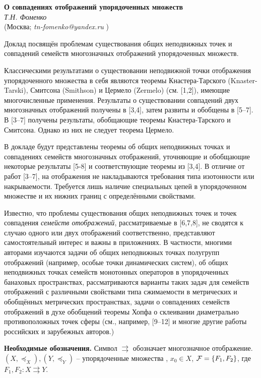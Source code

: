 \begin{center}{ \bf О совпадениях отображений упорядоченных множеств}\\
{\it Т.Н. Фоменко} \\
(Москва; {\it tn-fomenko@yandex.ru} )
\end{center}

Доклад посвящён проблемам существования общих неподвижных точек и совпадений семейств многозначных отображений упорядоченных множеств.

Классическими результатами о существовании неподвижной точки отображения упорядоченного множества в себя являются теоремы Кна\-стера-Тарского (Knaster-Tarski), Смитсона (Smithson) и Цермело (Zer\-melo) (см. [1,2]), имеющие многочисленные применения. Результаты о существовании совпадений двух многозначных отображений получены в [3,4], затем развиты и обобщены  в [5--7]. В  [3--7] получены результаты, обобщающие теоремы Кнастера-Тарского и Смитсона. Однако из них не следует теорема Цермело.

В докладе будут представлены теоремы об общих неподвижных точках и совпадениях семейств многозначных отображений, уточняющие и обобщающие некоторые результаты [5-8] и  соответствующие теоремы из [3,4]. В отличие от  работ [3--7],  на отображения не накладываются требования типа изотонности или накрываемости. Требуется лишь наличие специальных цепей в упорядоченном множестве и их нижних границ с определёнными свойствами.

Известно, что проблемы существования  общих неподвижных точек и точек совпадения {\it семейств отображений}, рассматриваемые в [6,7,8],  не сводятся к случаю  одного или двух отображений соответственно, представляют самостоятельный интерес и важны в приложениях. В частности, многими авторами изучаются задачи об общих неподвижных точках  полугрупп отображений (например, особые точки динамических систем), об общих неподвижных точках семейств  монотонных операторов в упорядоченных банаховых пространствах, рассматриваются  варианты таких задач для семейств отображений с различными свойствами типа сжимаемости в метрических и обобщённых метрических пространствах, задачи о совпадениях семейств отображений в духе обобщений теоремы Хопфа о склеивании диаметрально противоположных точек сферы (см., например,  [9--12] и многие другие работы российских и зарубежных авторов.)

{\bf Необходимые обозначения.} Сим\-вол  $\rightrightarrows$  обозначает многозначное отображение. $(X,\preceq_{X}), (Y,\preceq_{Y})$ -- упорядоченные множества , $x_{0}\in X$, ${\cal F}=\{F_{1},F_{2}\}$, где
$F_{1},F_{2}: X\rightrightarrows Y$.

